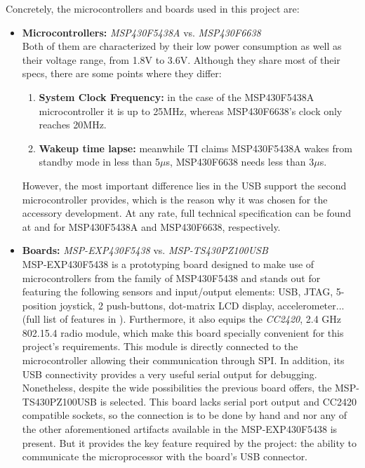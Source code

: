 			Concretely, the microcontrollers and boards used in this project are:
			\begin{itemize}
				\item \textbf{Microcontrollers:} \emph{MSP430F5438A} vs. \emph{MSP430F6638}\\
					Both of them are characterized by their low power consumption as well as their voltage 
					range, from 1.8V to 3.6V. Although they share most of their specs, there are some points
					where they differ:
					\begin{enumerate}
						\item \textbf{System Clock Frequency:} in the case of the MSP430F5438A microcontroller
							it is up to 25MHz, whereas MSP430F6638's clock only reaches 20MHz.
						\item \textbf{Wakeup time lapse:} meanwhile TI claims MSP430F5438A wakes from 
							standby mode in less than 5$\mu$s, MSP430F6638 needs less than 3$\mu$s.
					\end{enumerate}
					However, the most important difference lies in the USB support the second microcontroller
					provides, which is the reason why it was chosen for the accessory development. At any rate, 
					full technical specification can be found at \cite{5438a} and \cite{msp430f6638ds} for 
					MSP430F5438A and MSP430F6638, respectively.
				\item \textbf{Boards:} \emph{MSP-EXP430F5438} vs. \emph{MSP-TS430PZ100USB}\\
					MSP-EXP430F5438 \cite{5438aboard} is a prototyping board designed to make use of 
					microcontrollers from the family of MSP430F5438 and stands out for featuring the following 
					sensors and input/output elements: USB, JTAG, 5-position joystick, 2 push-buttons, 
					dot-matrix LCD display, accelerometer... (full list of features in \cite{5438aboard}). 
					Furthermore, it also equips the \emph{CC2420}, 2.4 GHz 802.15.4 radio module, 
					which make this board specially convenient for this project's requirements. This module is
					directly connected to the microcontroller allowing their communication through SPI. In
					addition, its USB connectivity provides a very useful serial output for debugging.\\
					
					Nonetheless, despite the wide possibilities the previous board offers, the MSP-TS430PZ100USB
					\cite{6638board} is selected. This board lacks serial port output and CC2420 compatible
					sockets, so the connection is to be done by hand and nor any of the other aforementioned
					artifacts available in the MSP-EXP430F5438 is present. But it provides the key feature
					required by the project: the ability to communicate the microprocessor with the board's USB
					connector.
			\end{itemize}
			
